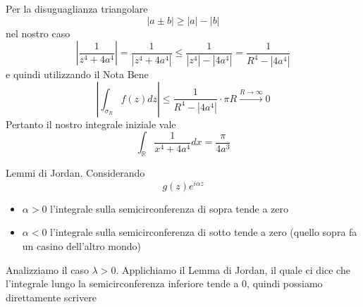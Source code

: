 Per la disuguaglianza triangolare
\begin{equation*}
\left| a\pm b\right| \geqslant \left| a\right| -\left| b\right| 
\end{equation*}
nel nostro caso
\begin{equation*}
\left| \frac{1}{z^{4} +4a^{4}}\right| =\frac{1}{\left| z^{4} +4a^{4}\right| } \leqslant \frac{1}{\left| z^{4}\right| -\left| 4a^{4}\right| } =\frac{1}{R^{4} -\left| 4a^{4}\right| }
\end{equation*}
e quindi utilizzando il Nota Bene
\begin{equation*}
\left| \int _{\sigma _{R}} f\left( z\right) dz\right| \leqslant \frac{1}{R^{4} -\left| 4a^{4}\right| } \cdotp \pi R\xrightarrow{R\rightarrow \infty } 0
\end{equation*}
Pertanto il nostro integrale iniziale vale
\begin{equation*}
\int _{\mathbb{R}}\frac{1}{x^{4} +4a^{4}} dx=\frac{\pi }{4a^{3}}
\end{equation*}
\Soluzione
\begin{thm}
Lemmi di Jordan. Considerando
\begin{equation*}
g\left( z\right) e^{i\alpha z}
\end{equation*}
\begin{itemize}
\item $\alpha  >0$ l'integrale sulla semicirconferenza di sopra tende a zero
\item $\alpha < 0$ l'integrale sulla semicirconferenza di sotto tende a zero (quello sopra fa un casino dell'altro mondo)
\end{itemize}
\end{thm}
Analizziamo il caso $\lambda  >0$. Applichiamo il Lemma di Jordan, il quale ci dice che l'integrale lungo la semicirconferenza inferiore tende a $0$, quindi possiamo direttamente scrivere


